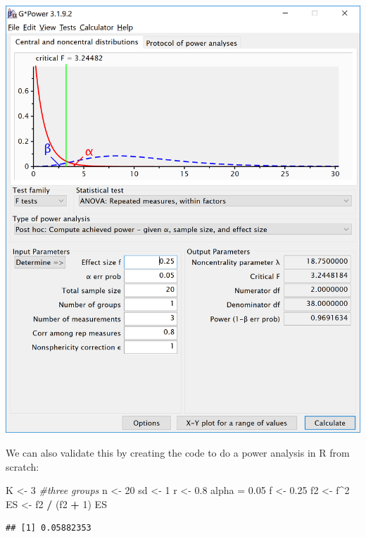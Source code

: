 \documentclass[]{book}
\newenvironment{Shaded}{\begin{snugshade}}{\end{snugshade}}
\newcommand{\CommentTok}[1]{\textcolor[rgb]{0.56,0.35,0.01}{\textit{#1}}}
\newcommand{\DecValTok}[1]{\textcolor[rgb]{0.00,0.00,0.81}{#1}}
\newcommand{\FloatTok}[1]{\textcolor[rgb]{0.00,0.00,0.81}{#1}}
\newcommand{\NormalTok}[1]{#1}
\newcommand{\OperatorTok}[1]{\textcolor[rgb]{0.81,0.36,0.00}{\textbf{#1}}}
\newcommand{\StringTok}[1]{\textcolor[rgb]{0.31,0.60,0.02}{#1}}
\begin{document}
\includegraphics{screenshots/gpower_12.png}

We can also validate this by creating the code to do a power analysis in R from scratch:

\begin{Shaded}
\begin{Highlighting}[]
\NormalTok{K <-}\StringTok{ }\DecValTok{3} \CommentTok{#three groups}
\NormalTok{n <-}\StringTok{ }\DecValTok{20}
\NormalTok{sd <-}\StringTok{ }\DecValTok{1}
\NormalTok{r <-}\StringTok{ }\FloatTok{0.8}
\NormalTok{alpha =}\StringTok{ }\FloatTok{0.05}
\NormalTok{f <-}\StringTok{ }\FloatTok{0.25}
\NormalTok{f2 <-}\StringTok{ }\NormalTok{f}\OperatorTok{^}\DecValTok{2}
\NormalTok{ES <-}\StringTok{ }\NormalTok{f2 }\OperatorTok{/}\StringTok{ }\NormalTok{(f2 }\OperatorTok{+}\StringTok{ }\DecValTok{1}\NormalTok{)}
\NormalTok{ES}
\end{Highlighting}
\end{Shaded}

\begin{verbatim}
## [1] 0.05882353
\end{verbatim}
\end{document}
